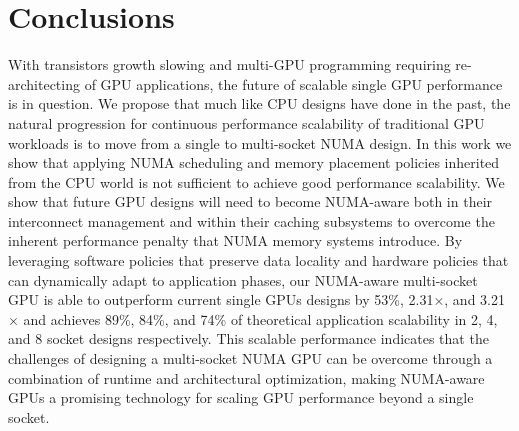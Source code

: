 \section{Conclusions}
\label{conclusions}
With transistors growth slowing and multi-GPU programming requiring 
re-architecting of GPU applications, the future of scalable single GPU 
performance is in question.  We propose that much like CPU designs have done in 
the past, the natural progression for continuous performance scalability of 
traditional GPU workloads is to move from a single to multi-socket NUMA design.  
In this work we show 
that applying NUMA scheduling and memory placement policies inherited 
from the CPU world is not sufficient to achieve good performance scalability.  
We show that future GPU designs will need to become NUMA-aware both in their 
interconnect management and within their caching subsystems to overcome the 
inherent performance penalty that NUMA memory systems introduce.  By leveraging 
software policies that preserve data locality and hardware policies that can 
dynamically adapt to application phases, our NUMA-aware multi-socket GPU is able to 
outperform current single GPUs designs by 53\%, 2.31$\times$, and 3.21$\times$ and 
achieves 89\%, 84\%, and 74\% of theoretical application scalability in 2, 4, 
and 8 socket designs respectively.  This scalable performance indicates that the 
challenges of designing a multi-socket NUMA GPU can be overcome through a combination
of runtime and architectural optimization, making 
NUMA-aware GPUs a promising technology for scaling GPU performance beyond a 
single socket.


